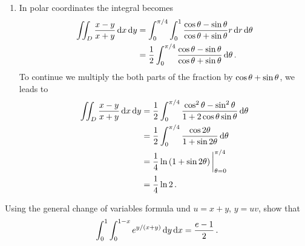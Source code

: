 \begin{solution}
\begin{enumerate}
\item
\begin{adjustbox}{valign=T,raise=\strutheight,minipage={\linewidth}}
  \begin{wrapfigure}{r}{0.35\textwidth}
    \centering
{}
\end{wrapfigure}
\strut{}
In polar coordinates the integral becomes
\begin{align*}
\iint_D \frac{x-y}{x+y} \,\mathrm{d} x \,\mathrm{d} y
&= \int_0^{\pi/4} \int_0^1 \frac{\cos \theta - \sin \theta}{\cos \theta + \sin \theta} 
r \,\mathrm{d} r \,\mathrm{d} \theta \\
&= \frac 12 \int_0^{\pi/4} \frac{\cos \theta - \sin \theta}{\cos \theta + \sin \theta} \,\mathrm{d} \theta\,.
\end{align*}
To continue we multiply the both parts of the fraction by $\cos \theta + \sin \theta$, we leads to
\begin{align*}
\iint_D \frac{x-y}{x+y} \,\mathrm{d} x \,\mathrm{d} y
&= \frac 12 \int_0^{\pi/4} \frac{\cos^2 \theta - \sin^2 \theta}{1 + 2\cos \theta \sin \theta} \,\mathrm{d} \theta \\
&= \frac 12 \int_0^{\pi/4} \frac{\cos 2\theta}{1+\sin 2\theta} \,\mathrm{d} \theta \\
&= \frac 14 \ln \left(1 + \sin 2\theta\right) \bigg|_{\theta=0}^{\pi/4} \\
&= \frac 14 \ln 2\,.
\end{align*}
\end{adjustbox}
\end{enumerate}
\end{solution}

\begin{question}
Using the general change of variables formula und $u=x+y$, $y=uv$, show that
\[
\int_0^1 \int_0^{1-x} e^{y/(x+y)} \,\mathrm{d} y \,\mathrm{d} x = \frac{e-1}2\,.
\]
\end{question}


